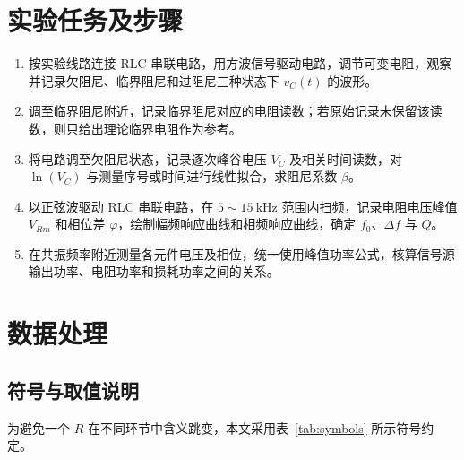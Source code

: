 ﻿\documentclass[UTF8,12pt,a4paper]{ctexart}
\numberwithin{equation}{section}
\begin{document}
\section{实验任务及步骤}

\begin{enumerate}[label=\arabic*.,leftmargin=2.2em]
    \item 按实验线路连接 RLC 串联电路，用方波信号驱动电路，调节可变电阻，观察并记录欠阻尼、临界阻尼和过阻尼三种状态下 \(v_C(t)\) 的波形。
    \item 调至临界阻尼附近，记录临界阻尼对应的电阻读数；若原始记录未保留该读数，则只给出理论临界电阻作为参考。
    \item 将电路调至欠阻尼状态，记录逐次峰谷电压 \(V_C\) 及相关时间读数，对 \(\ln(V_C)\) 与测量序号或时间进行线性拟合，求阻尼系数 \(\beta\)。
    \item 以正弦波驱动 RLC 串联电路，在 \(5\sim15\ \mathrm{kHz}\) 范围内扫频，记录电阻电压峰值 \(V_{Rm}\) 和相位差 \(\varphi\)，绘制幅频响应曲线和相频响应曲线，确定 \(f_0\)、\(\Delta f\) 与 \(Q\)。
    \item 在共振频率附近测量各元件电压及相位，统一使用峰值功率公式，核算信号源输出功率、电阻功率和损耗功率之间的关系。
\end{enumerate}

\section{数据处理}

\subsection{符号与取值说明}

为避免一个 \(R\) 在不同环节中含义跳变，本文采用表~\ref{tab:symbols} 所示符号约定。
\end{document}
